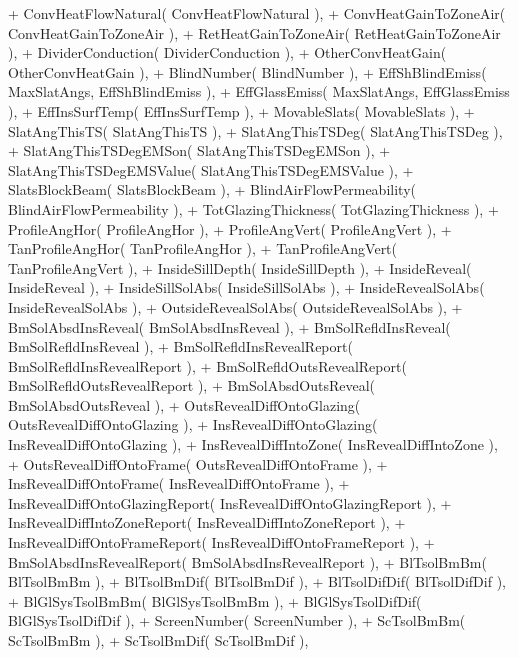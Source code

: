 \begin{DoxyCode}
+           ConvHeatFlowNatural( ConvHeatFlowNatural ),
+           ConvHeatGainToZoneAir( ConvHeatGainToZoneAir ),
+           RetHeatGainToZoneAir( RetHeatGainToZoneAir ),
+           DividerConduction( DividerConduction ),
+           OtherConvHeatGain( OtherConvHeatGain ),
+           BlindNumber( BlindNumber ),
+           EffShBlindEmiss( MaxSlatAngs, EffShBlindEmiss ),
+           EffGlassEmiss( MaxSlatAngs, EffGlassEmiss ),
+           EffInsSurfTemp( EffInsSurfTemp ),
+           MovableSlats( MovableSlats ),
+           SlatAngThisTS( SlatAngThisTS ),
+           SlatAngThisTSDeg( SlatAngThisTSDeg ),
+           SlatAngThisTSDegEMSon( SlatAngThisTSDegEMSon ),
+           SlatAngThisTSDegEMSValue( SlatAngThisTSDegEMSValue ),
+           SlatsBlockBeam( SlatsBlockBeam ),
+           BlindAirFlowPermeability( BlindAirFlowPermeability ),
+           TotGlazingThickness( TotGlazingThickness ),
+           ProfileAngHor( ProfileAngHor ),
+           ProfileAngVert( ProfileAngVert ),
+           TanProfileAngHor( TanProfileAngHor ),
+           TanProfileAngVert( TanProfileAngVert ),
+           InsideSillDepth( InsideSillDepth ),
+           InsideReveal( InsideReveal ),
+           InsideSillSolAbs( InsideSillSolAbs ),
+           InsideRevealSolAbs( InsideRevealSolAbs ),
+           OutsideRevealSolAbs( OutsideRevealSolAbs ),
+           BmSolAbsdInsReveal( BmSolAbsdInsReveal ),
+           BmSolRefldInsReveal( BmSolRefldInsReveal ),
+           BmSolRefldInsRevealReport( BmSolRefldInsRevealReport ),
+           BmSolRefldOutsRevealReport( BmSolRefldOutsRevealReport ),
+           BmSolAbsdOutsReveal( BmSolAbsdOutsReveal ),
+           OutsRevealDiffOntoGlazing( OutsRevealDiffOntoGlazing ),
+           InsRevealDiffOntoGlazing( InsRevealDiffOntoGlazing ),
+           InsRevealDiffIntoZone( InsRevealDiffIntoZone ),
+           OutsRevealDiffOntoFrame( OutsRevealDiffOntoFrame ),
+           InsRevealDiffOntoFrame( InsRevealDiffOntoFrame ),
+           InsRevealDiffOntoGlazingReport( InsRevealDiffOntoGlazingReport ),
+           InsRevealDiffIntoZoneReport( InsRevealDiffIntoZoneReport ),
+           InsRevealDiffOntoFrameReport( InsRevealDiffOntoFrameReport ),
+           BmSolAbsdInsRevealReport( BmSolAbsdInsRevealReport ),
+           BlTsolBmBm( BlTsolBmBm ),
+           BlTsolBmDif( BlTsolBmDif ),
+           BlTsolDifDif( BlTsolDifDif ),
+           BlGlSysTsolBmBm( BlGlSysTsolBmBm ),
+           BlGlSysTsolDifDif( BlGlSysTsolDifDif ),
+           ScreenNumber( ScreenNumber ),
+           ScTsolBmBm( ScTsolBmBm ),
+           ScTsolBmDif( ScTsolBmDif ),

\end{DoxyCode}
